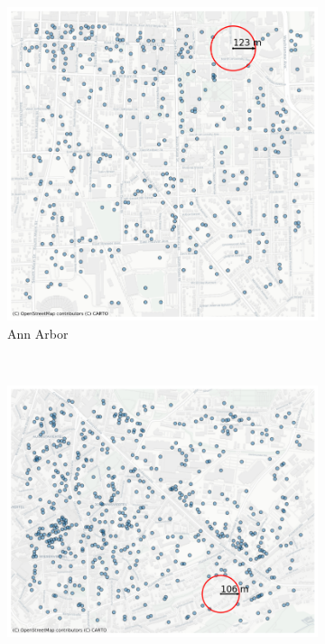 \begin{figure}[!t]
 \centering
 \begin{minipage}[b]{0.50\textwidth}
   \begin{subfigure}[b]{\linewidth}
    \centering\includegraphics[clip, trim=0.0cm 0.0cm 0.0cm 0.0cm, width=\linewidth]{chapter_5_mapping/imgs/annarbor_ls_max_dist.png}
     \caption{Ann Arbor}\label{subfig-2:dummy}
   \end{subfigure}\\[\baselineskip]
   \begin{subfigure}[b]{\linewidth}
    \centering\includegraphics[clip, trim=0.0cm 0.0cm 0.0cm 0.0cm, width=\linewidth]{chapter_5_mapping/imgs/witten_ls_max_dist.png}

\end{subfigure}
\end{minipage}
\end{figure}
